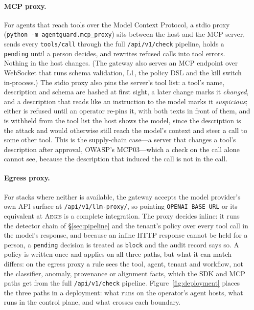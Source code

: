 \documentclass[sigconf,nonacm]{acmart}
\newcommand{\system}{\textsc{Aegis}\xspace}
\begin{document}
\paragraph{MCP proxy.}
For agents that reach tools over the Model Context Protocol, a stdio
proxy (\texttt{python -m agentguard.mcp\_proxy}) sits between the host
and the MCP server, sends every \texttt{tools/call} through the full
\texttt{/api/v1/check} pipeline, holds a \texttt{pending} until a person
decides, and rewrites refused calls into tool errors. Nothing in the host
changes. (The gateway also serves an MCP endpoint over WebSocket that
runs schema validation, L1, the policy DSL and the kill switch
in-process.) The stdio proxy also pins the server's tool list: a tool's name, description and schema are hashed at first
sight, a later change marks it \emph{changed}, and a description that
reads like an instruction to the model marks it \emph{suspicious}; either
is refused until an operator re-pins it, with both texts in front of
them, and is withheld from the tool list the host shows the model, since
the description is the attack and would otherwise still reach the model's
context and steer a call to some other tool. This is the supply-chain case---a server that changes a tool's
description after approval, OWASP's MCP03---which a check on the call
alone cannot see, because the description that induced the call is
not in the call.

\paragraph{Egress proxy.}
For stacks where neither is available, the gateway accepts the model
provider's own API surface at \texttt{/api/v1/llm-proxy/}, so pointing
\texttt{OPENAI\_BASE\_URL} or its equivalent at \system is a complete
integration. The proxy decides inline: it runs the detector chain of
\S\ref{sec:pipeline} and the tenant's policy over every tool call in the
model's response, and because an inline HTTP response cannot be held
for a person, a \texttt{pending} decision is treated as \texttt{block} and
the audit record says so. A policy is written once and applies on all
three paths, but what it can match differs: on the egress proxy a rule
sees the tool, agent, tenant and workflow, not the classifier, anomaly,
provenance or alignment facts, which the SDK and MCP paths get from the
full \texttt{/api/v1/check} pipeline.
Figure~\ref{fig:deployment} places the three paths in a deployment:
what runs on the operator's agent hosts, what runs in the control plane,
and what crosses each boundary.
\end{document}
